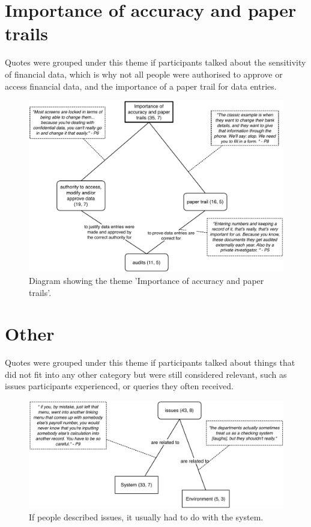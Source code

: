 \section{Importance of accuracy and paper trails}
Quotes were grouped under this theme if participants talked about the sensitivity of financial data, which is why not all people were authorised to approve or access financial data, and the importance of a paper trail for data entries. 

\begin{figure}[!ht]
\centering
\includegraphics[width=\textwidth]{images/ch12/Papertrail.pdf}
\caption[Study 1 Importance of accuracy and paper trails diagram]{Diagram showing the theme 'Importance of accuracy and paper trails'.}
\vspace{-9pt}
\label{fig:ch3_papertrail}
\end{figure}

\section{Other}
Quotes were grouped under this theme if participants talked about things that did not fit into any other category but were still considered relevant, such as issues participants experienced, or queries they often received.

\begin{figure}[!ht]
\centering
\includegraphics[width=\textwidth]{images/ch12/Other.pdf}
\caption[Study 1 Other diagram]{If people described issues, it usually had to do with the system.}
\vspace{-9pt}
\label{fig:ch3_other}
\end{figure}

